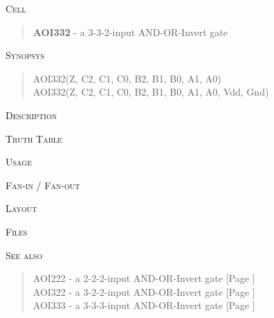
\label{AOI332}
\textsc{Cell}
\begin{quote}
    \textbf{AOI332} - a 3-3-2-input AND-OR-Invert gate
\end{quote}

\textsc{Synopsys}
\begin{quote}
    AOI332(Z, C2, C1, C0, B2, B1, B0, A1, A0) \\
    AOI332(Z, C2, C1, C0, B2, B1, B0, A1, A0, Vdd, Gnd)
\end{quote}

\textsc{Description}

%

\textsc{Truth Table}


\textsc{Usage}

\textsc{Fan-in / Fan-out}

\textsc{Layout}

\textsc{Files}

\textsc{See also}
\begin{quote}
    AOI222 - a 2-2-2-input AND-OR-Invert gate [Page \pageref{AOI222}] \\
    AOI322 - a 3-2-2-input AND-OR-Invert gate [Page \pageref{AOI322}] \\
    AOI333 - a 3-3-3-input AND-OR-Invert gate [Page \pageref{AOI333}]
\end{quote}
